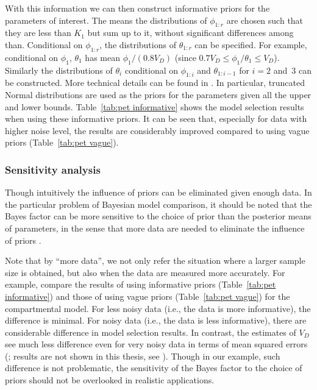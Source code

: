With this information we can then construct informative priors for the parameters of interest. The means the distributions of $\phi_{1:r}$ are chosen such that they are less than $K_1$ but sum up to it, without significant differences among than. Conditional on $\phi_{1:r}$, the distributions of $\theta_{1:r}$ can be specified. For example, conditional on $\phi_1$, $\theta_1$ has mean $\phi_1/(0.8V_D)$ (since $0.7V_D \le \phi_1/\theta_1 \le V_D$). Similarly the distributions of $\theta_i$ conditional on $\phi_{1:i}$ and $\theta_{1:i-1}$ for $i = 2$ and~$3$ can be constructed. More technical details can be found in \cite{Zhou2013}. In particular, truncated Normal distributions are used as the priors for the parameters given all the upper and lower bounds. Table~\ref{tab:pet informative} shows the model selection results when using these informative priors. It can be seen that, especially for data with higher noise level, the results are considerably improved compared to using vague priors (Table~\ref{tab:pet vague}).



\subsubsection{Sensitivity analysis}
\label{ssub:Sensitivity analysis}

Though intuitively the influence of priors can be eliminated given enough data. In the particular problem of Bayesian model comparison, it should be noted that the Bayes factor can be more sensitive to the choice of prior than the posterior means of parameters, in the sense that more data are needed to eliminate the influence of priors \cite{Kass:1993vy,Kass:1995vb}.

Note that by ``more data'', we not only refer the situation where a larger sample size is obtained, but also when the data are measured more accurately. For example, compare the results of using informative priors (Table~\ref{tab:pet informative}) and those of using vague priors (Table~\ref{tab:pet vague}) for the \pet compartmental model. For less noisy data (i.e., the data is more informative), the difference is minimal. For noisy data (i.e., the data is less informative), there are considerable difference in model selection results. In contrast, the estimates of $V_D$ see much less difference even for very noisy data in terms of mean squared errors (\mse; results are not shown in this thesis, see \cite{Zhou2013}). Though in our example, such difference is not problematic, the sensitivity of the Bayes factor to the choice of priors should not be overlooked in realistic applications.

